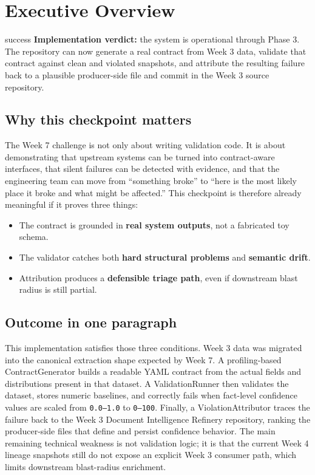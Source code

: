 \documentclass[11pt]{report}
\begin{document}
\tableofcontents
\clearpage

\chapter*{Executive Overview}

\begin{statusbox}{success}
\textbf{Implementation verdict:} the system is operational through Phase 3.
The repository can now generate a real contract from Week 3 data, validate that contract against clean and violated snapshots, and attribute the resulting failure back to a plausible producer-side file and commit in the Week 3 source repository.
\end{statusbox}

\section*{Why this checkpoint matters}
The Week 7 challenge is not only about writing validation code. It is about demonstrating that upstream systems can be turned into contract-aware interfaces, that silent failures can be detected with evidence, and that the engineering team can move from ``something broke'' to ``here is the most likely place it broke and what might be affected.'' This checkpoint is therefore already meaningful if it proves three things:

\begin{itemize}[leftmargin=1.5em]
  \item The contract is grounded in \textbf{real system outputs}, not a fabricated toy schema.
  \item The validator catches both \textbf{hard structural problems} and \textbf{semantic drift}.
  \item Attribution produces a \textbf{defensible triage path}, even if downstream blast radius is still partial.
\end{itemize}

\section*{Outcome in one paragraph}
This implementation satisfies those three conditions. Week 3 data was migrated into the canonical extraction shape expected by Week 7. A profiling-based ContractGenerator builds a readable YAML contract from the actual fields and distributions present in that dataset. A ValidationRunner then validates the dataset, stores numeric baselines, and correctly fails when fact-level confidence values are scaled from \texttt{0.0--1.0} to \texttt{0--100}. Finally, a ViolationAttributor traces the failure back to the Week 3 Document Intelligence Refinery repository, ranking the producer-side files that define and persist confidence behavior. The main remaining technical weakness is not validation logic; it is that the current Week 4 lineage snapshots still do not expose an explicit Week 3 consumer path, which limits downstream blast-radius enrichment.
\end{document}
